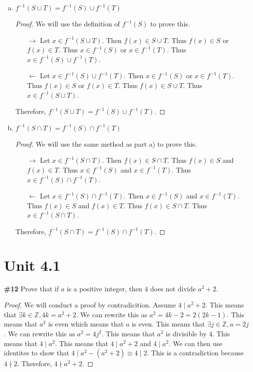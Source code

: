 \documentclass{article}
\newcommand{\unit}[1]{\section{Unit #1}}
\newcommand{\problem}[1]{\textbf{\##1}}
\newcommand{\prob}[1]{\problem{#1}}
\newcommand{\union}{\cup}
\newcommand{\intersection}{\cap}
\newcommand{\AllIntegers}{\mathbb{Z}}
\begin{document}
\begin{enumerate}[a)]
    \item \(f^{-1}(S \union T) = f^{-1}(S) \union f^{-1}(T)\)
    \begin{proof}We will use the definition of \(f^{-1}(S)\) to prove this.
        \begin{enumerate}
            \item[\(\rightarrow\)] Let \(x \in f^{-1}(S \union T)\). Then \(f(x) \in S \union T\). Thus \(f(x) \in S\) or \(f(x) \in T\). Thus \(x \in f^{-1}(S)\) or \(x \in f^{-1}(T)\). Thus \(x \in f^{-1}(S) \union f^{-1}(T)\).
            \item[\(\leftarrow\)] Let \(x \in f^{-1}(S) \union f^{-1}(T)\). Then \(x \in f^{-1}(S)\) or \(x \in f^{-1}(T)\). Thus \(f(x) \in S\) or \(f(x) \in T\). Thus \(f(x) \in S \union T\). Thus \(x \in f^{-1}(S \union T)\).
        \end{enumerate}
    Therefore, \(f^{-1}(S \union T) = f^{-1}(S) \union f^{-1}(T)\).
    \end{proof}
    \item \(f^{-1}(S \intersection T) = f^{-1}(S) \intersection f^{-1}(T)\)
    \begin{proof}
        We will use the same method as part a) to prove this.
        \begin{enumerate}
            \item [\(\rightarrow\)] Let \(x \in f^{-1}(S \intersection T)\). Then \(f(x) \in S \intersection T\). Thus \(f(x) \in S\) and \(f(x) \in T\). Thus \(x \in f^{-1}(S)\) and \(x \in f^{-1}(T)\). Thus \(x \in f^{-1}(S) \intersection f^{-1}(T)\).
            \item [\(\leftarrow\)] Let \(x \in f^{-1}(S) \intersection f^{-1}(T)\). Then \(x \in f^{-1}(S)\) and \(x \in f^{-1}(T)\). Thus \(f(x) \in S\) and \(f(x) \in T\). Thus \(f(x) \in S \intersection T\). Thus \(x \in f^{-1}(S \intersection T)\).
        \end{enumerate}
    Therefore, \(f^{-1}(S \intersection T) = f^{-1}(S) \intersection f^{-1}(T)\).
    \end{proof}
\end{enumerate}
\pagebreak


\unit{4.1}
\prob{12}
Prove that if \(a\) is a positive integer, then \(4\) does not divide \(a^2 + 2\).
\begin{proof}
    We will conduct a proof by contradicition. Assume \(4 \mid a^2 + 2\). This means that \(\exists k \in \AllIntegers, 4k = a^2 + 2\). We can rewrite this as \(a^2 = 4k - 2 = 2(2k - 1)\). This means that \(a^2\) is even which means that \(a\) is even. This means that \(\exists j \in \AllIntegers, a = 2j\). We can rewrite this as \(a^2 = 4j^2\). This means that \(a^2\) is divisible by 4. This means that \(4 \mid a^2\). This means that \(4 \mid a^2 + 2\) and \(4 \mid a^2\). We can then use identites to show that \(4 \mid a^2 - (a^2 + 2) \equiv 4 \mid 2\). This is a contradiction because \(4 \nmid 2\). Therefore, \(4 \nmid a^2 + 2\).
\end{proof}
\end{document}
